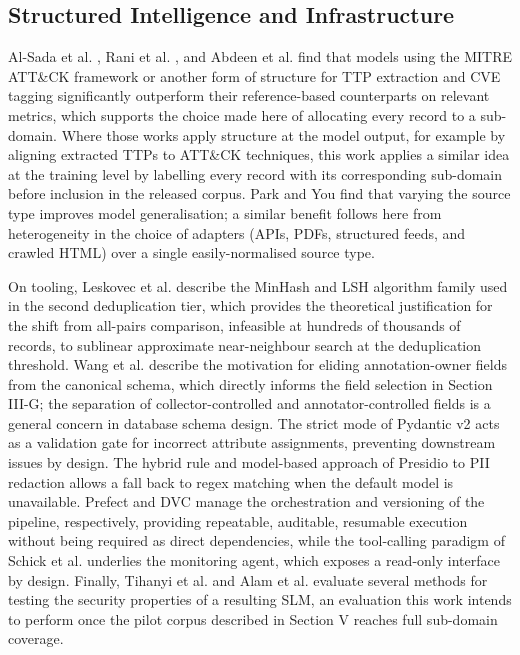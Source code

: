 \documentclass[conference]{IEEEtran}
\begin{document}
\subsection{Structured Intelligence and Infrastructure}
Al-Sada et al. \cite{alsada2025attck}, Rani et al. \cite{rani2024ttpxhunter}, and Abdeen et al. \cite{abdeen2023smet} find that models using the MITRE ATT\&CK framework or another form of structure for TTP extraction and CVE tagging significantly outperform their reference-based counterparts on relevant metrics, which supports the choice made here of allocating every record to a sub-domain. Where those works apply structure at the model output, for example by aligning extracted TTPs to ATT\&CK techniques, this work applies a similar idea at the training level by labelling every record with its corresponding sub-domain before inclusion in the released corpus. Park and You\cite{park2023pretrained} find that varying the source type improves model generalisation; a similar benefit follows here from heterogeneity in the choice of adapters (APIs, PDFs, structured feeds, and crawled HTML) over a single easily-normalised source type.

On tooling, Leskovec et al. \cite{leskovec2014mmd} describe the MinHash and LSH algorithm family used in the second deduplication tier, which provides the theoretical justification for the shift from all-pairs comparison, infeasible at hundreds of thousands of records, to sublinear approximate near-neighbour search at the deduplication threshold. Wang et al.\cite{wang2023selfinstruct} describe the motivation for eliding annotation-owner fields from the canonical schema, which directly informs the field selection in Section III-G; the separation of collector-controlled and annotator-controlled fields is a general concern in database schema design. The strict mode of Pydantic v2 \cite{pydanticv2} acts as a validation gate for incorrect attribute assignments, preventing downstream issues by design. The hybrid rule and model-based approach of Presidio \cite{presidio2023} to PII redaction allows a fall back to regex matching when the default model is unavailable. Prefect \cite{prefect2023} and DVC \cite{dvc2023} manage the orchestration and versioning of the pipeline, respectively, providing repeatable, auditable, resumable execution without being required as direct dependencies, while the tool-calling paradigm of Schick et al.\cite{schick2023toolformer} underlies the monitoring agent, which exposes a read-only interface by design. Finally, Tihanyi et al. \cite{tihanyi2024cybermetric} and Alam et al. \cite{alam2024ctibench} evaluate several methods for testing the security properties of a resulting SLM, an evaluation this work intends to perform once the pilot corpus described in Section V reaches full sub-domain coverage.
\end{document}
